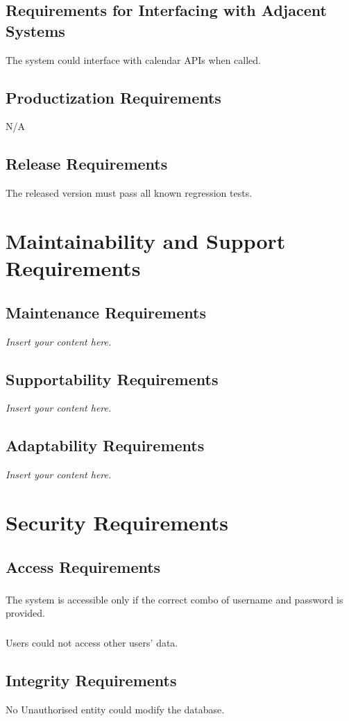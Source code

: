 \documentclass[12pt]{article}
\newcommand{\lips}{\textit{Insert your content here.}}
\begin{document}
\subsection{Requirements for Interfacing with Adjacent Systems}
The system could interface with calendar APIs when called.
\subsection{Productization Requirements}
N/A
\subsection{Release Requirements}
The released version must pass all known regression tests.

\section{Maintainability and Support Requirements}
\subsection{Maintenance Requirements}
\lips
\subsection{Supportability Requirements}
\lips
\subsection{Adaptability Requirements}
\lips

\section{Security Requirements}
\subsection{Access Requirements}
\subsubsection{}
The system is accessible only if the correct combo of username and password is provided.
\subsubsection{}
Users could not access other users' data.
\subsection{Integrity Requirements}
No Unauthorised entity could modify the database.
\end{document}
